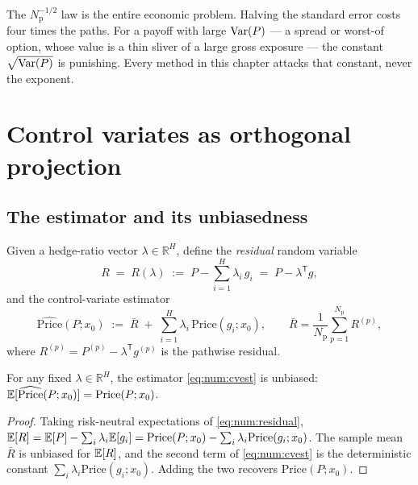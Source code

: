 The $N_{\mathrm{p}}^{-1/2}$ law is the entire economic problem. Halving the standard error
costs four times the paths. For a payoff with large $\operatorname{Var}(P)$ --- a spread or
worst-of option, whose value is a thin sliver of a large gross exposure --- the
constant $\sqrt{\operatorname{Var}(P)}$ is punishing. Every method in this chapter attacks
that constant, never the exponent.

\section{Control variates as orthogonal projection}
\label{sec:num:cv}

\subsection{The estimator and its unbiasedness}

\begin{definition}\label{def:num:cvest}
Given a hedge-ratio vector $\lambda \in \mathbb{R}^H$, define the
\emph{residual} random variable
\begin{equation}\label{eq:num:residual}
   R \;=\; R(\lambda) \;:=\; P - \sum_{i=1}^{H} \lambda_i\, g_i
   \;=\; P - \lambda^{\mathsf T} g ,
\end{equation}
and the control-variate estimator
\begin{equation}\label{eq:num:cvest}
   \widehat{\mathrm{Price}}(P; x_0)
   \;:=\;
   \bar R \;+\; \sum_{i=1}^{H} \lambda_i \, \mathrm{Price}(g_i; x_0),
   \qquad
   \bar R = \frac{1}{N_{\mathrm{p}}}\sum_{p=1}^{N_{\mathrm{p}}} R^{(p)},
\end{equation}
where $R^{(p)} = P^{(p)} - \lambda^{\mathsf T} g^{(p)}$ is the pathwise residual.
\end{definition}

\begin{proposition}\label{prop:num:unbiased}
For any fixed $\lambda \in \mathbb{R}^H$, the estimator \eqref{eq:num:cvest} is
unbiased: $\mathbb{E}[\widehat{\mathrm{Price}}(P;x_0)] = \mathrm{Price}(P;x_0)$.
\end{proposition}

\begin{proof}
Taking risk-neutral expectations of \eqref{eq:num:residual},
$\mathbb{E}[R] = \mathbb{E}[P] - \sum_i \lambda_i \mathbb{E}[g_i] = \mathrm{Price}(P;x_0) - \sum_i \lambda_i
\mathrm{Price}(g_i;x_0)$. The sample mean $\bar R$ is unbiased for $\mathbb{E}[R]$, and the
second term of \eqref{eq:num:cvest} is the deterministic constant
$\sum_i \lambda_i \mathrm{Price}(g_i;x_0)$. Adding the two recovers $\mathrm{Price}(P;x_0)$.
\end{proof}

